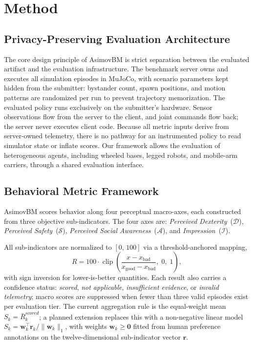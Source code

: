 \documentclass[conference]{IEEEtran}
\begin{document}
\section{Method}

\subsection{Privacy-Preserving Evaluation Architecture}

The core design principle of AsimovBM is strict separation between the
evaluated artifact and the evaluation infrastructure.
The benchmark server owns and executes all simulation episodes in MuJoCo,
with scenario parameters kept hidden from the submitter: bystander count,
spawn positions, and motion patterns are randomized per run to prevent
trajectory memorization.
The evaluated policy runs exclusively on the submitter's hardware.
Sensor observations flow from the server to the client, and joint commands
flow back; the server never executes client code.
Because all metric inputs derive from server-owned telemetry, there is no
pathway for an instrumented policy to read simulator state or inflate scores.
Our framework allows the evaluation of heterogeneous
agents, including wheeled bases, legged robots, and mobile-arm carriers,
through a shared evaluation interface.

\subsection{Behavioral Metric Framework}

AsimovBM scores behavior along four perceptual macro-axes, each constructed
from three objective sub-indicators.
The four axes are: \textit{Perceived Dexterity}~($\mathcal{D}$),
\textit{Perceived Safety}~($\mathcal{S}$),
\textit{Perceived Social Awareness}~($\mathcal{A}$), and
\textit{Impression}~($\mathcal{I}$).

All sub-indicators are normalized to $[0,\,100]$ via a threshold-anchored
mapping,
\begin{equation}
  R = 100\cdot\operatorname{clip}\!\left(
    \frac{x - x_{\text{bad}}}{x_{\text{good}} - x_{\text{bad}}},\;0,\;1
  \right), \label{eq:norm}
\end{equation}
with sign inversion for lower-is-better quantities.
Each result also carries a confidence status: \textit{scored},
\textit{not applicable}, \textit{insufficient evidence}, or
\textit{invalid telemetry}; macro scores are suppressed when fewer than
three valid episodes exist per evaluation tier.
The current aggregation rule is the equal-weight mean
$S_k = \bar{R}_k^{\textit{scored}}$; a planned extension replaces this with
a non-negative linear model $S_k = \mathbf{w}_k^\top\mathbf{r}_k /
\|\mathbf{w}_k\|_1$, with weights $\mathbf{w}_k \ge \mathbf{0}$ fitted from
human preference annotations on the twelve-dimensional sub-indicator vector
$\mathbf{r}$.
\end{document}
